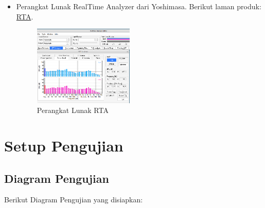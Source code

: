 \documentclass{article}
\begin{document}
\begin{itemize}
		\item Perangkat Lunak RealTime Analyzer dari Yoshimasa.
		Berikut laman produk: \href{http://www.ymec.com/products/dssf3e/}{RTA}.
		
		\begin{figure}[H]
			\centering
			\includegraphics[width=0.45\textwidth,angle=0]{images/rta_fft}
			\caption{Perangkat Lunak RTA}
		\end{figure}
		
	\end{itemize}

	\newpage
	
	\section{Setup Pengujian}
	
	\subsection{Diagram Pengujian}
	
	Berikut Diagram Pengujian yang disiapkan:
	
\end{document}
